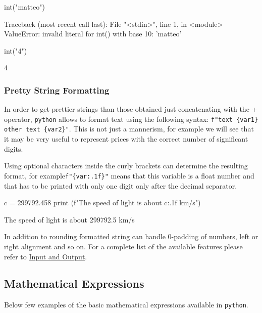 \begin{ipythonnon}
int("matteo")
\end{ipythonnon}
\begin{ioutput}
Traceback (most recent call last):
  File "<stdin>", line 1, in <module>
ValueError: invalid literal for int() with base 10: 'matteo'
\end{ioutput}

\begin{ipythonnon}
int("4") 
\end{ipythonnon}
\begin{ioutput}
4
\end{ioutput}

\subsubsection{Pretty String Formatting}
In order to get prettier strings than those obtained just concatenating with the + operator, \texttt{python} allows to format text using the following syntax: \texttt{f"text \{var1\} other text \{var2\}"}.
This is not just a mannerism, for example we will see that it may be very useful to represent prices with the correct number of significant digits.

Using optional characters inside the curly brackets can determine the resulting format, for example\texttt{f"\{var:.1f\}"} means that this variable is a float number and that has to be printed with only one digit only after the decimal separator. 

\begin{ipythonnon}
c = 299792.458
print (f"The speed of light is about {c:.1f} km/s")	
\end{ipythonnon}
\begin{ioutput}
The speed of light is about 299792.5 km/s
\end{ioutput}

In addition to rounding formatted string can handle 0-padding of numbers, left or right alignment and so on. For a complete list of the available features please refer to \href{https://docs.python.org/3/tutorial/inputoutput.html}{Input and Output}.

\subsection{Mathematical Expressions}\label{mathematical-expressions}

Below few examples of the basic mathematical expressions available in \texttt{python}.

